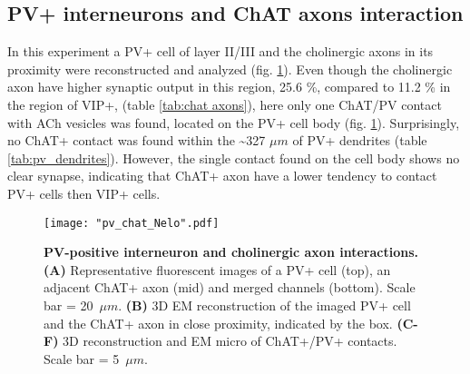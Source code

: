 \subsection{PV+ interneurons and ChAT axons interaction}
\label{subsec:PV+ChAT}
In this experiment a PV+ cell of layer II/III and the cholinergic axons in its proximity were reconstructed and analyzed (fig. \ref{fig:pv_chat}). Even though the cholinergic axon have higher synaptic output in this region, 25.6 \%, compared to 11.2 \% in the region of VIP+, (table \ref{tab:chat axons}), here only one ChAT/PV contact with ACh vesicles was found, located on the PV+ cell body (fig. \ref{fig:pv_chat}). Surprisingly, no ChAT+ contact was found within the \textasciitilde 327 $\mu m$ of PV+ dendrites (table \ref{tab:pv_dendrites}). However, the single contact found on the cell body shows no clear synapse, indicating that ChAT+ axon have a lower tendency to contact PV+ cells then VIP+ cells. 
\begin{figure}
	\captionsetup[figure]{indentation=0pt}
	\texttt{[image: "pv\_chat\_Nelo".pdf]}
	\caption[PV-positive interneuron and cholinergic axon interactions.]{\textbf{PV-positive interneuron and cholinergic axon interactions.} \textbf{(A)} Representative fluorescent images of a PV+ cell (top), an adjacent ChAT+ axon (mid) and merged channels (bottom). Scale bar = 20~$\mu m$. \textbf{(B)} 3D EM reconstruction of the imaged PV+ cell and the ChAT+ axon in close proximity, indicated by the box. \textbf{(C-F)} 3D reconstruction and EM micro of ChAT+/PV+ contacts. Scale bar = 5~$\mu m$.}
	\label{fig:pv_chat}
\end{figure}
